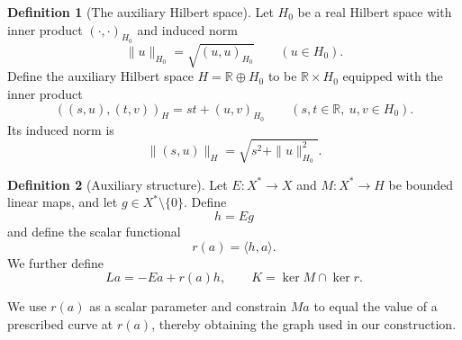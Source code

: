 \documentclass[11pt]{article}
\newcommand{\R}{\mathbb R}
\newcommand{\pair}[2]{\langle #1,#2\rangle}
\theoremstyle{definition}
\newtheorem{definition}{Definition}
\theoremstyle{remark}
\begin{document}
\begin{definition}[The auxiliary Hilbert space]
\label{def:hilbert-spaces-norms}
Let $H_0$ be a real Hilbert space with inner product $(\cdot,\cdot)_{H_0}$ and induced norm
\[
\|u\|_{H_0}=\sqrt{(u,u)_{H_0}}\qquad(u\in H_0).
\]
Define the auxiliary Hilbert space $H=\R\oplus H_0$ to be $\R\times H_0$ equipped with the inner product
\[
((s,u),(t,v))_H=st+(u,v)_{H_0}
\qquad(s,t\in\R,\ u,v\in H_0).
\]
Its induced norm is
\[
\|(s,u)\|_H=\sqrt{s^2+\|u\|_{H_0}^2}.
\]
\end{definition}


\begin{definition}[Auxiliary structure]
\label{def:construction-maps}
Let $E:X^*\to X$ and $M:X^*\to H$ be bounded linear maps, and let
$g\in X^*\setminus\{0\}$. Define
\[
h=Eg
\]
and define the scalar functional
\[
r(a)=\pair{h}{a}.
\]
We further define
\[
La=-Ea+r(a)h,
\qquad
K=\ker M\cap\ker r.
\]
\end{definition}



We use $r(a)$ as a scalar parameter and constrain $Ma$ to equal the value of a prescribed curve at $r(a)$, thereby obtaining the graph used in our construction. 
\end{document}
